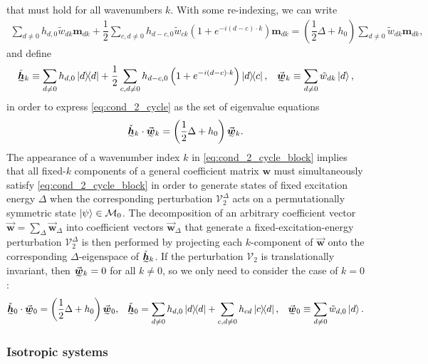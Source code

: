 \documentclass[nofootinbib,notitlepage,11pt]{revtex4-2}
\newcommand{\f}[2]{\dfrac{#1}{#2}} %
\newcommand{\p}[1]{\left(#1\right)} %
\renewcommand{\c}{\cdot} %
\newcommand{\m}{\bm} %
\renewcommand{\v}{\vec} %
\newcommand{\1}{\mathds{1}}
\newcommand{\M}{\mathcal{M}}
\newcommand{\V}{\mathcal{V}}
\newcommand{\ut}{\undertilde}
\begin{document}
that must hold for all wavenumbers $k$.  With some re-indexing, we can
write
\begin{align}
  \sum_{d\ne0} h_{d,0} \tilde w_{dk} \m m_{dk}
  + \f12 \sum_{c,d\ne0} h_{d-c,0} \tilde w_{ck}
  \p{1 + e^{-i\p{d-c}\c k}} \m m_{dk}
  = \p{\f12\Delta + h_0} \sum_{d\ne0} \tilde w_{dk} \m m_{dk},
  \label{eq:cond_2_cycle}
\end{align}
and define
\begin{align}
  \ut{\check{\m h}}_k
  \equiv \sum_{d\ne0} h_{d,0} \op{d}
  + \f12 \sum_{c,d\ne0} h_{d-c,0} \p{1+e^{-i\p{d-c}\c k}} \op{d}{c},
  &&
  \ut{\v{\m w}}_k \equiv \sum_{d\ne0} \tilde w_{dk} \ket{d},
  \label{eq:cycle_vecs}
\end{align}
in order to express \eqref{eq:cond_2_cycle} as the set of eigenvalue
equations
\begin{align}
  \ut{\check{\m h}}_k \c \ut{\v{\m w}}_k
  = \p{\f12\Delta + h_0} \ut{\v{\m w}}_k.
  \label{eq:cond_2_cycle_block}
\end{align}
The appearance of a wavenumber index $k$ in
\eqref{eq:cond_2_cycle_block} implies that all fixed-$k$ components of
a general coefficient matrix $\m w$ must simultaneously satisfy
\eqref{eq:cond_2_cycle_block} in order to generate states of fixed
excitation energy $\Delta$ when the corresponding perturbation
$\V_2^\Delta$ acts on a permutationally symmetric state
$\ket\psi\in\M_0$.  The decomposition of an arbitrary coefficient
vector $\v{\m w}=\sum_\Delta\v{\m w}_\Delta$ into coefficient vectors
$\v{\m w}_\Delta$ that generate a fixed-excitation-energy perturbation
$\V_2^\Delta$ is then performed by projecting each $k$-component of
$\v{\m w}$ onto the corresponding $\Delta$-eigenspace of
$\ut{\check{\m h}}_k$.  If the perturbation $\V_2$ is translationally
invariant, then $\ut{\v{\m w}}_k=0$ for all $k\ne0$, so we only need
to consider the case of $k=0$:
\begin{align}
  \ut{\check{\m h}}_0 \c \ut{\v{\m w}}_0
  = \p{\f12\Delta + h_0} \ut{\v{\m w}}_0,
  &&
  \ut{\check{\m h}}_0
  = \sum_{d\ne0} h_{d,0} \op{d}
  + \sum_{c,d\ne0} h_{cd} \op{c}{d},
  &&
  \ut{\v{\m w}}_0 \equiv \sum_{d\ne0} \tilde w_{d,0} \ket{d}.
  \label{eq:cond_2_cycle_0}
\end{align}

\subsubsection{Isotropic systems}
\end{document}
